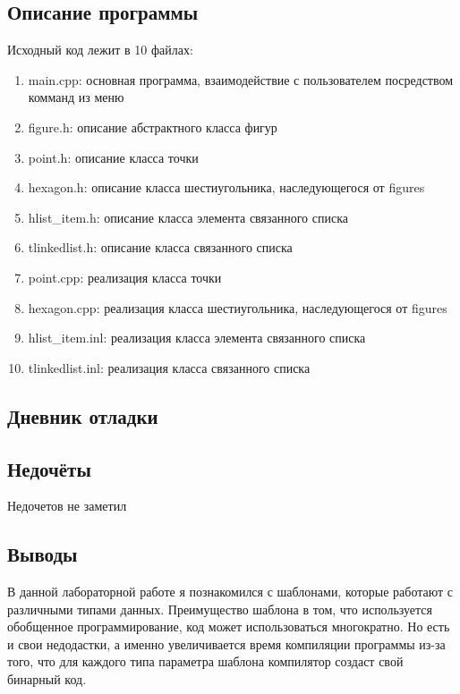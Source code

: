 \documentclass[12pt]{article}
\begin{document}
\subsection*{Описание программы}

Исходный код лежит в 10 файлах:
\begin{enumerate}
\item main.cpp: основная программа, взаимодействие с пользователем посредством комманд из меню

\item figure.h:    описание абстрактного класса фигур

\item point.h:    описание класса точки
\item hexagon.h: описание класса шестиугольника, наследующегося от figures
\item hlist\_item.h: описание класса элемента связанного списка
\item tlinkedlist.h: описание класса связанного списка

\item point.cpp:     реализация класса точки
\item hexagon.cpp:  реализация класса шестиугольника, наследующегося от figures
\item hlist\_item.inl: реализация класса элемента связанного списка
\item tlinkedlist.inl: реализация класса связанного списка

\end{enumerate}

\subsection*{Дневник отладки}

\subsection*{Недочёты}
Недочетов не заметил

\subsection*{Выводы}
В данной лабораторной работе я познакомился с шаблонами, которые работают с различными типами данных. Преимущество шаблона в том, что используется обобщенное программирование, код может использоваться многократно. Но есть и свои недодастки, а именно увеличивается время компиляции программы из-за того, что для каждого типа параметра шаблона компилятор создаст свой бинарный код.
\end{document}

